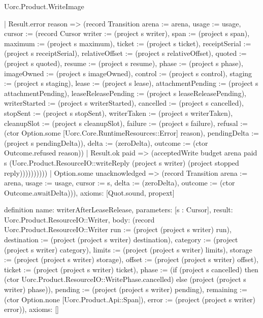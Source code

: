 \begin{lexlean}{Uorc.Product.WriteImage}
\begin{semanticmodule}
{        | Result.error reason => (record Transition {arena := arena, usage := usage, cursor := (record Cursor {writer := (project s writer), span := (project s span), maximum := (project s maximum), ticket := (project s ticket), receiptSerial := (project s receiptSerial), relativeOffset := (project s relativeOffset), quoted := (project s quoted), resume := (project s resume), phase := (project s phase), imageOwned := (project s imageOwned), control := (project s control), staging := (project s staging), lease := (project s lease), attachmentPending := (project s attachmentPending), leaseReleasePending := (project s leaseReleasePending), writerStarted := (project s writerStarted), cancelled := (project s cancelled), stopSent := (project s stopSent), writerTaken := (project s writerTaken), cleanupSlot := (project s cleanupSlot), failure := (project s failure), refusal := (ctor Option.some [Uorc.Core.RuntimeResources::Error] reason), pendingDelta := (project s pendingDelta)}), delta := (zeroDelta), outcome := (ctor Outcome.refused reason)})
        | Result.ok paid => (acceptedWrite budget arena paid s (Uorc.Product.ResourceIO::writeReply (project s writer) (project stopped reply))))))))))
    | Option.some unacknowledged => (record Transition {arena := arena, usage := usage, cursor := s, delta := (zeroDelta), outcome := (ctor Outcome.awaitDelta)})),
  axioms: [Quot.sound, propext]
}

definition{
  name: writerAfterLeaseRelease,
  parameters: [s : Cursor],
  result: Uorc.Product.ResourceIO::Writer,
  body: (record Uorc.Product.ResourceIO::Writer {run := (project (project s writer) run), destination := (project (project s writer) destination), category := (project (project s writer) category), limits := (project (project s writer) limits), storage := (project (project s writer) storage), offset := (project (project s writer) offset), ticket := (project (project s writer) ticket), phase := (if (project s cancelled) then (ctor Uorc.Product.ResourceIO::WritePhase.cancelled) else (project (project s writer) phase)), pending := (project (project s writer) pending), remaining := (ctor Option.none [Uorc.Product.Api::Span]), error := (project (project s writer) error)}),
  axioms: []
}


\end{semanticmodule}
\end{lexlean}
